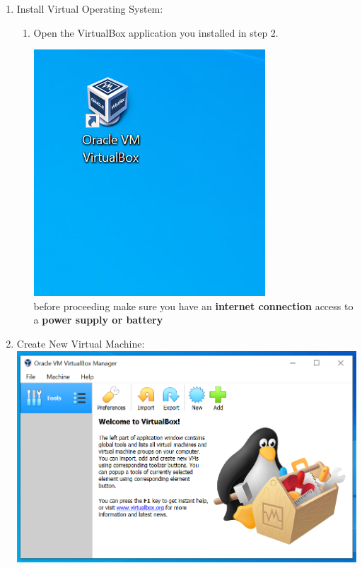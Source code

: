 \documentclass[12pt]{article}
\newcommand{\R}{\color{red}}
\newcommand{\B}{\color{blue}}
\begin{document}
\begin{description}
\begin{enumerate}
\item Install Virtual Operating System: \vspace{0mm} \\
\begin{enumerate} 
    	\item Open the VirtualBox application you installed in step 2. \vspace{5mm} \\
    	\begin{multicols}{2}
      	\includegraphics[scale=.6]{Capture2.png}\\
          
                
                before proceeding make sure you have an {\bf \B internet connection } access to a {\bf \R power supply or battery }
         
            \end{multicols}
            
            \end{enumerate}
	\newpage
	\item Create New Virtual Machine: \vspace{20mm} \\
      		\hspace*{-2.5cm}\includegraphics[scale=.6]{Capture3.png}\\
               \begin{itemize}
                

\end{itemize}
\end{enumerate}
\end{description}
\end{document}

